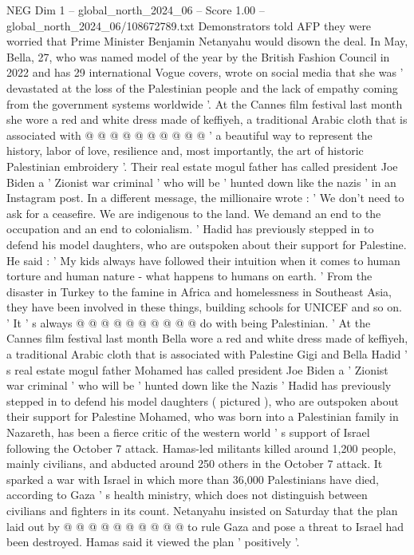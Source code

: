 \begin{textsample}{NEG Dim 1 – global\_north\_2024\_06 – Score 1.00 – global\_north\_2024\_06/108672789.txt}
Demonstrators told AFP they were worried that Prime Minister Benjamin Netanyahu would disown the deal.
In May, Bella, 27, who was named model of the year by the British Fashion Council in 2022 and has 29 international Vogue covers, wrote on social media that she was ' devastated at the loss of the Palestinian people and the lack of empathy coming from the government systems worldwide '.
At the Cannes film festival last month she wore a red and white dress made of keffiyeh, a traditional Arabic cloth that is associated with @ @ @ @ @ @ @ @ @ @ ' a beautiful way to represent the history, labor of love, resilience and, most importantly, the art of historic Palestinian embroidery '.
Their real estate mogul father has called president Joe Biden a ' Zionist war criminal ' who will be ' hunted down like the nazis ' in an Instagram post.
In a different message, the millionaire wrote : ' We don't need to ask for a ceasefire.
We are indigenous to the land.
We demand an end to the occupation and an end to colonialism. ' Hadid has previously stepped in to defend his model daughters, who are outspoken about their support for Palestine.
He said : ' My kids always have followed their intuition when it comes to human torture and human nature - what happens to humans on earth. ' From the disaster in Turkey to the famine in Africa and homelessness in Southeast Asia, they have been involved in these things, building schools for UNICEF and so on. ' It ' s always @ @ @ @ @ @ @ @ @ @ do with being Palestinian. ' At the Cannes film festival last month Bella wore a red and white dress made of keffiyeh, a traditional Arabic cloth that is associated with Palestine Gigi and Bella Hadid ' s real estate mogul father Mohamed has called president Joe Biden a ' Zionist war criminal ' who will be ' hunted down like the Nazis ' Hadid has previously stepped in to defend his model daughters ( pictured ), who are outspoken about their support for Palestine Mohamed, who was born into a Palestinian family in Nazareth, has been a fierce critic of the western world ' s support of Israel following the October 7 attack.
Hamas-led militants killed around 1,200 people, mainly civilians, and abducted around 250 others in the October 7 attack.
It sparked a war with Israel in which more than 36,000 Palestinians have died, according to Gaza ' s health ministry, which does not distinguish between civilians and fighters in its count.
Netanyahu insisted on Saturday that the plan laid out by @ @ @ @ @ @ @ @ @ @ to rule Gaza and pose a threat to Israel had been destroyed.
Hamas said it viewed the plan ' positively '.

\end{textsample}
